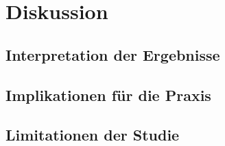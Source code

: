 \chapter{Diskussion}

\section{Interpretation der Ergebnisse}

\lipsum[1]

\section{Implikationen für die Praxis}

\lipsum[2]

\section{Limitationen der Studie}

\lipsum[3]